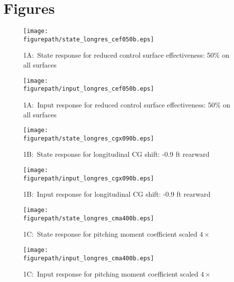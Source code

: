 \chapter{Figures}

\vspace{4in}
\;

\begin{figure}[H]
  \begin{center}
    \texttt{[image: \\figurepath/state\_longres\_cef050b.eps]}
    \caption{1A:\ State response for reduced control surface effectiveness: 50\% on all surfaces}
  \end{center}
\end{figure}

\begin{figure}[H]
  \begin{center}
    \texttt{[image: \\figurepath/input\_longres\_cef050b.eps]}
    \caption{1A:\ Input response for reduced control surface effectiveness: 50\% on all surfaces}
  \end{center}
\end{figure}

\begin{figure}[H]
  \begin{center}
    \texttt{[image: \\figurepath/state\_longres\_cgx090b.eps]}
    \caption{1B:\ State response for longitudinal CG shift: -0.9 ft rearward}
  \end{center}
\end{figure}

\begin{figure}[H]
  \begin{center}
    \texttt{[image: \\figurepath/input\_longres\_cgx090b.eps]}
    \caption{1B:\ Input response for longitudinal CG shift: -0.9 ft rearward}
  \end{center}
\end{figure}

\begin{figure}[H]
  \begin{center}
    \texttt{[image: \\figurepath/state\_longres\_cma400b.eps]}
    \caption{1C:\ State response for pitching moment coefficient scaled $4\times$}
  \end{center}
\end{figure}

\begin{figure}[H]
  \begin{center}
    \texttt{[image: \\figurepath/input\_longres\_cma400b.eps]}
    \caption{1C:\ Input response for pitching moment coefficient scaled $4\times$}
  \end{center}
\end{figure}

